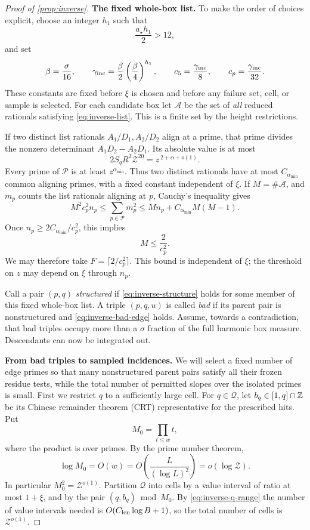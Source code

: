\begin{proof}[Proof of \cref{prop:inverse}]
\textbf{The fixed whole-box list.}
To make the order of choices explicit, choose an integer \(h_1\) such
that
\[
 \frac{a_\star h_1}{2}>12,
\]
and set
\begin{equation}
 \beta=\frac{\sigma}{16},\qquad
 \gamma_{\rm inc}=\frac{\beta}{2}
       \left(\frac{\beta}{4}\right)^{h_1},\qquad
 c_5=\frac{\gamma_{\rm inc}}{8},\qquad
 c_p=\frac{\gamma_{\rm inc}}{32}.
 \label{eq:inverse-fixed-constants}
\end{equation}
These constants are fixed before \(\xi\) is chosen and before any
failure set, cell, or sample is selected.
For each candidate box let \(\mathcal A\) be the set of \emph{all}
reduced rationals satisfying \eqref{eq:inverse-list}.
This is a finite set by the height restrictions.

If two distinct list rationals \(A_1/D_1,A_2/D_2\) align at a prime,
that prime divides the nonzero determinant \(A_1D_2-A_2D_1\).
Its absolute value is at most
\[
 2 S_q R^2\mathcal Z^{20}=z^{\,2+\alpha+o(1)}.
\]
Every prime of \(\mathcal P\) is at least \(z^{\alpha_{\min}}\).
Thus two distinct rationals have at most \(C_{\alpha_{\min}}\)
common aligning primes, with a fixed constant independent of \(\xi\).
If \(M=\#\mathcal A\), and \(m_p\) counts the list rationals aligning
at \(p\), Cauchy's inequality gives
\[
 M^2c_p^2 n_p
 \le\sum_{p\in\mathcal P}m_p^2
 \le M n_p+C_{\alpha_{\min}}M(M-1).
\]
Once \(n_p\ge2C_{\alpha_{\min}}/c_p^2\), this implies
\[
 M\le \frac{2}{c_p^2}.
\]
We may therefore take \(F=\lceil2/c_p^2\rceil\).
This bound is independent of \(\xi\); the threshold on \(z\) may depend
on \(\xi\) through \(n_p\).

Call a pair \((p,q)\) \emph{structured} if
\eqref{eq:inverse-structure} holds for some member of this fixed
whole-box list.  A triple \((p,q,u)\) is called \emph{bad} if its parent
pair is nonstructured and \eqref{eq:inverse-bad-edge} holds.
Assume, towards a contradiction, that bad triples occupy more than a
\(\sigma\) fraction of the full harmonic box measure. Descendants can
now be integrated out.

\medskip
\textbf{From bad triples to sampled incidences.}
We will select a fixed number of edge primes so that many nonstructured
parent pairs satisfy all their frozen residue tests, while the total
number of permitted slopes over the isolated primes is small.
First we restrict \(q\) to a
sufficiently large cell. For \(q\in\mathcal Q\), let
\(b_q\in[1,q]\cap\mathbb Z\) be its
Chinese remainder theorem (CRT) representative for the prescribed hits.  Put
\[
 M_0=\prod_{t\le w}t ,
\]
where the product is over primes.  By the prime number theorem,
\[
 \log M_0=O(w)
 =O\!\left(\frac{L}{(\log L)^2}\right)=o(\log\mathcal Z).
\]
In particular \(M_0^2=\mathcal Z^{o(1)}\).
Partition \(\mathcal Q\) into cells by a value interval of ratio at
most \(1+\xi\), and by the pair
\((q,b_q)\bmod M_0\).  By \eqref{eq:inverse-q-range} the number of value
intervals needed is \(O(C_{\rm len}\log B+1)\), so the total number of
cells is \(\mathcal Z^{o(1)}\).


\end{proof}
